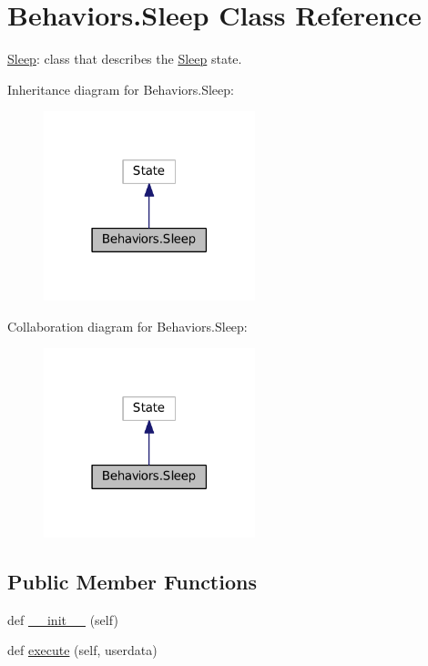 \hypertarget{classBehaviors_1_1Sleep}{}\section{Behaviors.\+Sleep Class Reference}
\label{classBehaviors_1_1Sleep}


\hyperlink{classBehaviors_1_1Sleep}{Sleep}\+: class that describes the \hyperlink{classBehaviors_1_1Sleep}{Sleep} state.  




Inheritance diagram for Behaviors.\+Sleep\+:\nopagebreak
\begin{figure}[H]
\begin{center}
\leavevmode
\includegraphics[width=174pt]{classBehaviors_1_1Sleep__inherit__graph}
\end{center}
\end{figure}


Collaboration diagram for Behaviors.\+Sleep\+:\nopagebreak
\begin{figure}[H]
\begin{center}
\leavevmode
\includegraphics[width=174pt]{classBehaviors_1_1Sleep__coll__graph}
\end{center}
\end{figure}
\subsection*{Public Member Functions}
\begin{DoxyCompactItemize}
\item 
def \hyperlink{classBehaviors_1_1Sleep_accfb4124bccdbacf41004911ab15b447}{\+\_\+\+\_\+init\+\_\+\+\_\+} (self)
\item 
def \hyperlink{classBehaviors_1_1Sleep_ae2eb72a6c74a0c9154e7917550fafae4}{execute} (self, userdata)
\end{DoxyCompactItemize}


